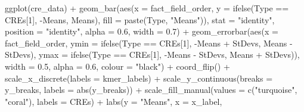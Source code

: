 \documentclass[
  letterpaper,
]{article}
\newenvironment{Shaded}{\begin{snugshade}}{\end{snugshade}}
\newcommand{\AttributeTok}[1]{\textcolor[rgb]{0.40,0.45,0.13}{#1}}
\newcommand{\DecValTok}[1]{\textcolor[rgb]{0.68,0.00,0.00}{#1}}
\newcommand{\FloatTok}[1]{\textcolor[rgb]{0.68,0.00,0.00}{#1}}
\newcommand{\FunctionTok}[1]{\textcolor[rgb]{0.28,0.35,0.67}{#1}}
\newcommand{\NormalTok}[1]{\textcolor[rgb]{0.00,0.23,0.31}{#1}}
\newcommand{\SpecialCharTok}[1]{\textcolor[rgb]{0.37,0.37,0.37}{#1}}
\newcommand{\StringTok}[1]{\textcolor[rgb]{0.13,0.47,0.30}{#1}}
\begin{document}
\begin{Shaded}
\begin{Highlighting}[]
  \FunctionTok{ggplot}\NormalTok{(cre\_data) }\SpecialCharTok{+}
    \FunctionTok{geom\_bar}\NormalTok{(}\FunctionTok{aes}\NormalTok{(}\AttributeTok{x =}\NormalTok{ fact\_field\_order, }
                 \AttributeTok{y =} \FunctionTok{ifelse}\NormalTok{(Type }\SpecialCharTok{==}\NormalTok{ CREs[}\DecValTok{1}\NormalTok{],}
                            \SpecialCharTok{{-}}\NormalTok{Means, Means), }
                 \AttributeTok{fill =} \FunctionTok{paste}\NormalTok{(Type, }\StringTok{"Means"}\NormalTok{)),}
             \AttributeTok{stat =} \StringTok{"identity"}\NormalTok{, }\AttributeTok{position =} \StringTok{"identity"}\NormalTok{, }
             \AttributeTok{alpha =} \FloatTok{0.6}\NormalTok{, }\AttributeTok{width =} \FloatTok{0.7}\NormalTok{) }\SpecialCharTok{+}
    \FunctionTok{geom\_errorbar}\NormalTok{(}\FunctionTok{aes}\NormalTok{(}\AttributeTok{x =}\NormalTok{ fact\_field\_order,}
                      \AttributeTok{ymin =} \FunctionTok{ifelse}\NormalTok{(Type }\SpecialCharTok{==}\NormalTok{ CREs[}\DecValTok{1}\NormalTok{],}
                                   \SpecialCharTok{{-}}\NormalTok{Means }\SpecialCharTok{+}\NormalTok{ StDevs,}
\NormalTok{                                    Means }\SpecialCharTok{{-}}\NormalTok{ StDevs),}
                      \AttributeTok{ymax =} \FunctionTok{ifelse}\NormalTok{(Type }\SpecialCharTok{==}\NormalTok{ CREs[}\DecValTok{1}\NormalTok{],}
                                   \SpecialCharTok{{-}}\NormalTok{Means }\SpecialCharTok{{-}}\NormalTok{ StDevs,}
\NormalTok{                                    Means }\SpecialCharTok{+}\NormalTok{ StDevs)),}
                  \AttributeTok{width =} \FloatTok{0.5}\NormalTok{, }\AttributeTok{alpha =} \FloatTok{0.6}\NormalTok{,}
                  \AttributeTok{colour =} \StringTok{"black"}\NormalTok{) }\SpecialCharTok{+}
    \FunctionTok{coord\_flip}\NormalTok{() }\SpecialCharTok{+}
    \FunctionTok{scale\_x\_discrete}\NormalTok{(}\AttributeTok{labels =}\NormalTok{ kmer\_labels) }\SpecialCharTok{+}
    \FunctionTok{scale\_y\_continuous}\NormalTok{(}\AttributeTok{breaks =}\NormalTok{ y\_breaks,}
                       \AttributeTok{labels =} \FunctionTok{abs}\NormalTok{(y\_breaks)) }\SpecialCharTok{+}
    \FunctionTok{scale\_fill\_manual}\NormalTok{(}\AttributeTok{values =} \FunctionTok{c}\NormalTok{(}\StringTok{"turquoise"}\NormalTok{, }\StringTok{"coral"}\NormalTok{),}
                      \AttributeTok{labels =}\NormalTok{ CREs) }\SpecialCharTok{+}
    \FunctionTok{labs}\NormalTok{(}\AttributeTok{y =} \StringTok{"Means"}\NormalTok{, }\AttributeTok{x =}\NormalTok{ x\_label,}

\end{Highlighting}
\end{Shaded}
\end{document}
